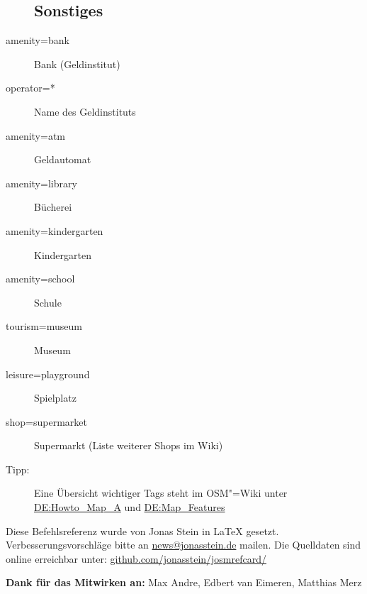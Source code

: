 \documentclass[a4paper,11pt,notumble]{leaflet}
\begin{document}
\begin{flushleft}
\begin{description}
\subsection*{Sonstiges}
\item[amenity=bank] Bank (Geldinstitut)
\item[operator=*] Name des Geldinstituts
\item[amenity=atm] Geldautomat
\item[amenity=library] Bücherei
\item[amenity=kindergarten] Kindergarten
\item[amenity=school] Schule
\item[tourism=museum] Museum
\item[leisure=playground] Spielplatz
\item[shop=supermarket] Supermarkt (Liste weiterer Shops im Wiki)
\\
\item[Tipp:] Eine Übersicht wichtiger Tags steht im OSM"=Wiki unter
\href{http://wiki.osm.org/wiki/DE:Howto_Map_A}{DE:Howto\_Map\_A} und
\href{http://wiki.openstreetmap.org/wiki/DE:Map_Features}{DE:Map\_Features}
\end{description}
\end{flushleft}




Diese Befehlsreferenz wurde von Jonas Stein in \LaTeX{} gesetzt.
Verbesserungsvorschläge bitte an
\href{mailto:news@jonasstein.de}{news@jonasstein.de} mailen.
Die Quelldaten sind online erreichbar unter:
\href{http://github.com/jonasstein/josmrefcard/}{github.com/jonasstein/josmrefcard/}

\textbf{Dank für das Mitwirken an:} Max Andre, 
Edbert van Eimeren, Matthias Merz
\end{document}
